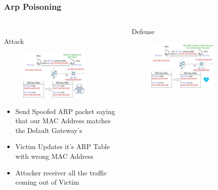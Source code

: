 \documentclass{beamer}
\begin{document}
\begin{frame}
\frametitle{Arp Poisoning}
\begin{columns}
    \begin{column}{0.5\textwidth}
        \\
        \Large Attack
        \begin{figure}
            \centering
            \includegraphics[width=0.8\textwidth]{arp_attack.jpg}\\
        \end{figure}
            \begin{itemize}[label={}]
                \item \footnotesize Send Spoofed ARP packet saying that our MAC Address matches the Default Gateway's
                \item \footnotesize Victim Updates it's ARP Table with wrong MAC Address
               \item \footnotesize Attacker receiver all the traffic coming out of Victim
            \end{itemize}
    \end{column}
    \begin{column}{0.5\textwidth}
        \Large Defense
        \begin{figure}
            \centering
            \includegraphics[width=0.8\textwidth]{arp_defense.jpg}\\

\end{figure}
\end{column}
\end{columns}
\end{frame}
\end{document}
